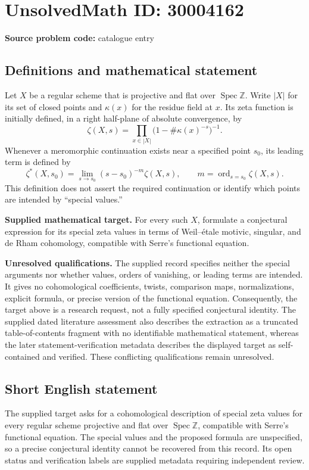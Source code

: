 \documentclass[11pt]{article}
\newcommand{\Z}{\mathbb{Z}}
\begin{document}
\section*{UnsolvedMath ID: 30004162}
\textbf{Source problem code:} catalogue entry
\subsection{Definitions and mathematical statement}
Let \(X\) be a regular scheme that is projective and flat over \(\operatorname{Spec}\Z\). Write \(|X|\) for its set of closed points and \(\kappa(x)\) for the residue field at \(x\). Its zeta function is initially defined, in a right half-plane of absolute convergence, by
\[
\zeta(X,s)=\prod_{x\in|X|}\bigl(1-\#\kappa(x)^{-s}\bigr)^{-1}.
\]
Whenever a meromorphic continuation exists near a specified point \(s_0\), its leading term is defined by
\[
\zeta^{*}(X,s_0)=\lim_{s\to s_0}(s-s_0)^{-m}\zeta(X,s),
\qquad m=\operatorname{ord}_{s=s_0}\zeta(X,s).
\]
This definition does not assert the required continuation or identify which points are intended by ``special values.''

\textbf{Supplied mathematical target.} For every such \(X\), formulate a conjectural expression for its special zeta values in terms of Weil--\'{e}tale motivic, singular, and de Rham cohomology, compatible with Serre's functional equation.

\textbf{Unresolved qualifications.} The supplied record specifies neither the special arguments nor whether values, orders of vanishing, or leading terms are intended. It gives no cohomological coefficients, twists, comparison maps, normalizations, explicit formula, or precise version of the functional equation. Consequently, the target above is a research request, not a fully specified conjectural identity. The supplied dated literature assessment also describes the extraction as a truncated table-of-contents fragment with no identifiable mathematical statement, whereas the later statement-verification metadata describes the displayed target as self-contained and verified. These conflicting qualifications remain unresolved.
\subsection{Short English statement}
The supplied target asks for a cohomological description of special zeta values for every regular scheme projective and flat over \(\operatorname{Spec}\Z\), compatible with Serre's functional equation. The special values and the proposed formula are unspecified, so a precise conjectural identity cannot be recovered from this record. Its open status and verification labels are supplied metadata requiring independent review.
\end{document}
